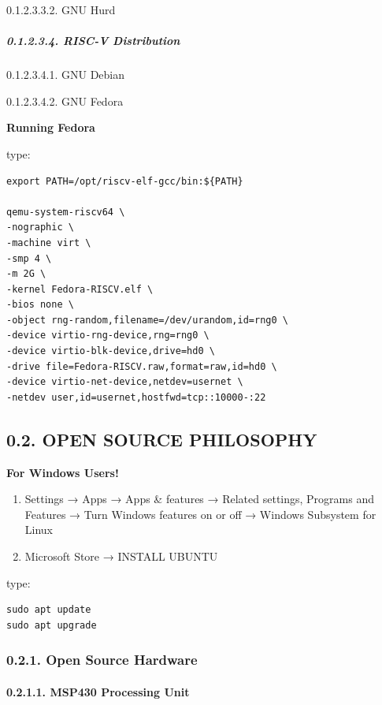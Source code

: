 \documentclass[
]{article}
\begin{document}
0.1.2.3.3.2. GNU Hurd

\hypertarget{risc-v-distribution-1}{%
\subparagraph{0.1.2.3.4. RISC-V
Distribution}\label{risc-v-distribution-1}}

0.1.2.3.4.1. GNU Debian

0.1.2.3.4.2. GNU Fedora

\textbf{Running Fedora}

type:

\begin{verbatim}
export PATH=/opt/riscv-elf-gcc/bin:${PATH}

qemu-system-riscv64 \
-nographic \
-machine virt \
-smp 4 \
-m 2G \
-kernel Fedora-RISCV.elf \
-bios none \
-object rng-random,filename=/dev/urandom,id=rng0 \
-device virtio-rng-device,rng=rng0 \
-device virtio-blk-device,drive=hd0 \
-drive file=Fedora-RISCV.raw,format=raw,id=hd0 \
-device virtio-net-device,netdev=usernet \
-netdev user,id=usernet,hostfwd=tcp::10000-:22
\end{verbatim}

\hypertarget{open-source-philosophy-1}{%
\subsection{0.2. OPEN SOURCE
PHILOSOPHY}\label{open-source-philosophy-1}}

\textbf{For Windows Users!}

\begin{enumerate}
\def\labelenumi{\arabic{enumi}.}
\item
  Settings → Apps → Apps \& features → Related settings, Programs and
  Features → Turn Windows features on or off → Windows Subsystem for
  Linux
\item
  Microsoft Store → INSTALL UBUNTU
\end{enumerate}

type:

\begin{verbatim}
sudo apt update
sudo apt upgrade
\end{verbatim}

\hypertarget{open-source-hardware-1}{%
\subsubsection{0.2.1. Open Source
Hardware}\label{open-source-hardware-1}}

\hypertarget{msp430-processing-unit-1}{%
\paragraph{0.2.1.1. MSP430 Processing
Unit}\label{msp430-processing-unit-1}}
\end{document}
